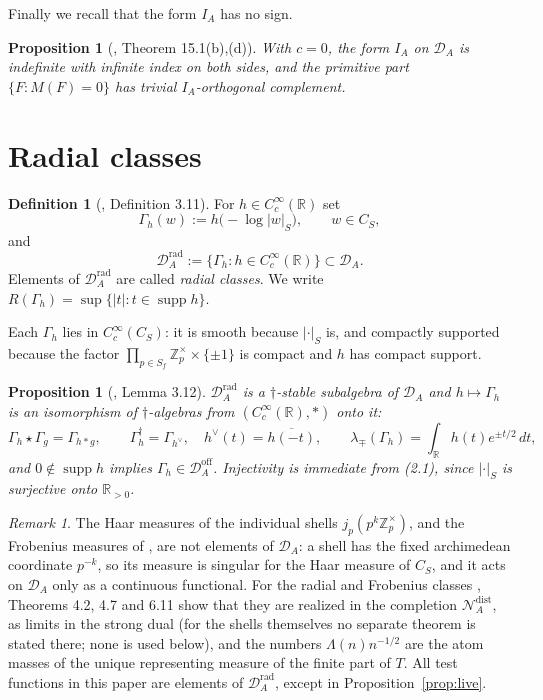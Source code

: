 \documentclass[11pt]{amsart}
\newtheorem{proposition}[theorem]{Proposition}
\theoremstyle{definition}
\newtheorem{definition}[theorem]{Definition}
\theoremstyle{remark}
\newtheorem{remark}[theorem]{Remark}
\newcommand{\R}{\mathbb R}
\newcommand{\Z}{\mathbb Z}
\newcommand{\supp}{\operatorname{supp}}
\newcommand{\DA}{\mathcal D_A}
\newcommand{\DAr}{\mathcal D_A^{\mathrm{rad}}}
\newcommand{\CS}{C_S}
\begin{document}
Finally we recall that the form $I_A$ has no sign.

\begin{proposition}[\cite{P43}, Theorem 15.1(b),(d)]
\label{prop:indefinite}
With $c=0$, the form $I_A$ on $\DA$ is indefinite with infinite index on both
sides, and the primitive part $\{F: M(F)=0\}$ has trivial $I_A$-orthogonal
complement.
\end{proposition}

\section{Radial classes}
\label{sec:radial}

\begin{definition}[\cite{P44}, Definition 3.11]
\label{def:radial}
For $h\in C_c^\infty(\R)$ set
\[
  \Gamma_h(w):=h\bigl(-\log|w|_S\bigr),\qquad w\in\CS ,
\]
and
\[
  \DAr:=\{\Gamma_h:h\in C_c^\infty(\R)\}\subset\DA .
  \tag{3.1}
\]
Elements of $\DAr$ are called \emph{radial classes}.  We write
$R(\Gamma_h)=\sup\{|t|:t\in\supp h\}$.
\end{definition}

Each $\Gamma_h$ lies in $C_c^\infty(\CS)$: it is smooth because
$|\cdot|_S$ is, and compactly supported because the factor
$\prod_{p\in S_f}\Z_p^\times\times\{\pm1\}$ is compact and $h$ has compact
support.

\begin{proposition}[\cite{P44}, Lemma 3.12]
\label{prop:radalg}
$\DAr$ is a $\dagger$-stable subalgebra of $\DA$ and $h\mapsto\Gamma_h$ is an
isomorphism of $\dagger$-algebras from $(C_c^\infty(\R),*)$ onto it:
\[
  \Gamma_h\star\Gamma_g=\Gamma_{h*g},\qquad
  \Gamma_h^\dagger=\Gamma_{h^\vee},\quad h^\vee(t)=\overline{h(-t)},\qquad
  \lambda_\mp(\Gamma_h)=\int_\R h(t)e^{\pm t/2}\,dt ,
  \tag{3.2}
\]
and $0\notin\supp h$ implies $\Gamma_h\in\DA^{\mathrm{off}}$.  Injectivity is
immediate from \emph{(2.1)}, since $|\cdot|_S$ is surjective onto $\R_{>0}$.
\end{proposition}

\begin{remark}
\label{rem:typing}
The Haar measures of the individual shells $j_p(p^k\Z_p^\times)$, and the
Frobenius measures of \cite{P44}, are not elements of $\DA$: a shell has the
fixed archimedean coordinate $p^{-k}$, so its measure is singular for the Haar
measure of $\CS$, and it acts on $\DA$ only as a continuous functional.  For
the radial and Frobenius classes \cite{P44}, Theorems 4.2, 4.7 and 6.11 show
that they are realized in the completion $\mathcal N_A^{\mathrm{dist}}$, as
limits in the strong dual (for the shells themselves no separate theorem is
stated there; none is used below), and the numbers
$\Lambda(n)n^{-1/2}$ are the atom masses of the unique representing measure of
the finite part of $T$.  All test functions in this paper are elements of
$\DAr$, except in Proposition~\ref{prop:live}.
\end{remark}
\end{document}
